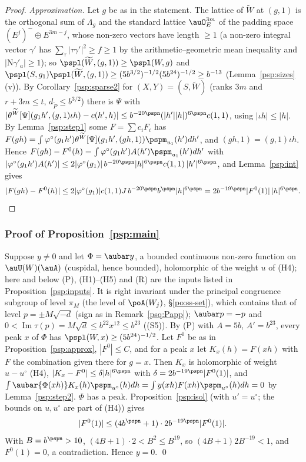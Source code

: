 \documentclass[10pt]{amsart}
\theoremstyle{definition}
\theoremstyle{remark}
\newcommand{\Iml}{\operatorname{Im}}
\begin{document}
\begin{proof}
\emph{Approximation.} Let $g$ be as in the statement. The lattice of $\widetilde W$ at $(g,1)$ is the
orthogonal sum of $\Lambda_g$ and the standard lattice $\auO_E^{3m}$ of the padding space $(E^j)^-\oplus E^{3m-j}$, whose non-zero vectors
have length $\ge1$ (a non-zero integral vector $\gamma'$ has $\sum_\tau|\tau\gamma'|^2\ge f\ge1$ by the
arithmetic--geometric mean inequality and $|\mathrm N\gamma'_a|\ge1$); so $\pspl(\widetilde W,(g,1))\ge
\pspl(W,g)$ and $\pspl(S,g_1)\pspl(\widetilde W,(g,1))\ge(5b^{3/2})^{-1/2}(5b^{24})^{-1/2}\ge b^{-13}$
(Lemma~\ref{psp:sizes}(v)). By Corollary~\ref{psp:sparse2} for $(X,Y)=(S,\widetilde W)$ (ranks $3m$ and
$r+3m\le t$, $d_{\widetilde P}\le b^{3/2}$) there is $\Psi$ with
$|\theta^{\widetilde W}[\Psi](g_1h',(g,1)\iota h)-c(h',h)|\le b^{-20\pspn}(|h'||h|)^{6\pspn}c(1,1)$, using
$|\iota h|\le|h|$. By Lemma~\ref{psp:step1} some $F=\sum c_iF_i$ has
$F(gh)=\int\varphi^\circ(g_1h')\theta^{\widetilde W}[\Psi](g_1h',(gh,1))\pspm_{u_1}(h')dh'$, and
$(gh,1)=(g,1)\iota h$. Hence $F(gh)-F^0(h)=\int\varphi^\circ(g_1h')A(h')\pspm_{u_1}(h')dh'$ with
$|\varphi^\circ(g_1h')A(h')|\le2|\varphi^\circ(g_1)|\,b^{-20\pspn}|h|^{6\pspn}c(1,1)\,|h'|^{6\pspn}$, and
Lemma~\ref{psp:int} gives
\[
|F(gh)-F^0(h)|\le2|\varphi^\circ(g_1)|c(1,1)J\,b^{-20\pspn}b^{\pspn}|h|^{6\pspn}=2b^{-19\pspn}|F^0(1)|
\,|h|^{6\pspn}. \qedhere
\]
\end{proof}

\subsubsection{Proof of Proposition~\ref{psp:main}}\label{psp:ss-proof}

Suppose $y\ne0$ and let $\Phi=\aubar y$, a bounded continuous non-zero function on $\auU(W)(\auA)$
(cuspidal, hence bounded), holomorphic of the weight $u$ of (H4); here and below (P), (H1)--(H5) and (R) are the inputs listed in Proposition~\ref{psp:inputs}. It is right invariant under the
principal congruence subgroup of level $\pi_M$ (the level of $\poA(W_j)$, \S\ref{po:ss-set}), which
contains that of level $p=\pm M\sqrt{-d}$ (sign as in Remark~\ref{psq:Papp}); $\aubar p=-p$ and $0<\Iml\tau(p)=M\sqrt d\le b^{22}x^{12}\le
b^{23}$ ((S5)). By (P) with $A=5b$, $A'=b^{23}$, every peak $x$ of $\Phi$ has $\pspl(W,x)\ge
(5b^{24})^{-1/2}$. Let $F^0$ be as in Proposition~\ref{psp:approx}, $|F^0|\le C$, and for a peak $x$
let $K_x(h)=F(xh)$ with $F$ the combination given there for $g=x$. Then $K_x$ is holomorphic of weight
$u-u^\circ$ (H4), $|K_x-F^0|\le\delta|h|^{6\pspn}$ with $\delta=2b^{-19\pspn}|F^0(1)|$, and
$\int\aubar{\Phi(xh)}K_x(h)\pspm_{u^\circ}(h)dh=\int y(xh)F(xh)\pspm_{u^\circ}(h)dh=0$ by
Lemma~\ref{psp:step2}. $\Phi$ has a peak. Proposition~\ref{psp:isol} (with $u'=u^\circ$; the bounds on
$u,u^\circ$ are part of (H4)) gives
\[
|F^0(1)|\le(4b^{\pspn}+1)\cdot2b^{-19\pspn}|F^0(1)| .
\]
With $B=b^{\pspn}>10$, $(4B+1)\cdot2<B^2\le B^{19}$, so $(4B+1)2B^{-19}<1$, and $F^0(1)=0$, a
contradiction. Hence $y=0$. \qed
\end{document}
